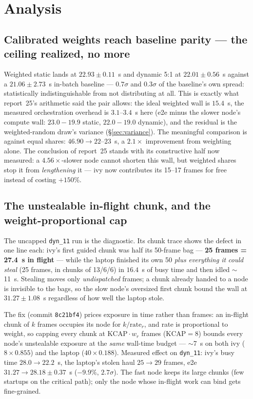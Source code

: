 \documentclass[
	english,
	letterpaper, oneside
]{article}
\begin{document}
\section{Analysis}
\label{sec:analysis}

\subsection{Calibrated weights reach baseline parity --- the ceiling realized, no more}
\label{sec:parity}

Weighted static lands at $22.93\pm0.11$~s and dynamic 5:1 at
$22.01\pm0.56$~s against a $21.06\pm2.73$~s in-batch baseline --- $0.7\sigma$
and $0.3\sigma$ of the baseline's own spread: statistically
indistinguishable from not distributing at all. This is exactly what
report~25's arithmetic said the pair allows: the ideal weighted wall is
$15.4$~s, the measured orchestration overhead is $3.1$--$3.4$~s here (e2e
minus the slower node's compute wall: $23.0-19.9$ static,
$22.0-19.0$ dynamic), and the residual is the weighted-random draw's
variance (\S\ref{sec:variance}). The meaningful comparison is against
equal shares: $46.90 \to 22$--$23$~s, a $2.1\times$ improvement from
weighting alone. The conclusion of report~25 stands with its constructive
half now measured: a $4.56\times$-slower node cannot shorten this wall, but
weighted shares stop it from \emph{lengthening} it --- ivy now contributes
its 15--17 frames for free instead of costing $+150\%$.

\subsection{The unstealable in-flight chunk, and the weight-proportional cap}
\label{sec:cap}

The uncapped \texttt{dyn\_11} run is the diagnostic. Its chunk trace shows
the defect in one line each: ivy's first guided chunk was half its 50-frame
bag --- \textbf{25 frames = 27.4~s in flight} --- while the laptop finished
its own 50 \emph{plus everything it could steal} (25 frames, in chunks of
13/6/6) in $16.4$~s of busy time and then idled $\sim$11~s. Stealing moves
only \emph{undispatched} frames; a chunk already handed to a node is
invisible to the bags, so the slow node's oversized first chunk bound the
wall at $31.27\pm1.08$~s regardless of how well the laptop stole.

The fix (commit \texttt{8c21bf4}) prices exposure in time rather than
frames: an in-flight chunk of $k$ frames occupies its node for
$k/\mathrm{rate}_r$, and rate is proportional to weight, so capping every
chunk at $\mathrm{KCAP}\cdot w_r$ frames ($\mathrm{KCAP}=8$) bounds every
node's unstealable exposure at the \emph{same} wall-time budget ---
$\sim$7~s on both ivy ($8\times0.855$) and the laptop
($40\times0.188$). Measured effect on \texttt{dyn\_11}: ivy's busy time
$28.0 \to 22.2$~s, the laptop's stolen haul $25 \to 29$ frames, e2e
$31.27 \to 28.18\pm0.37$~s ($-9.9\%$, $2.7\sigma$). The fast node keeps its
large chunks (few startups on the critical path); only the node whose
in-flight work can bind gets fine-grained.
\end{document}

